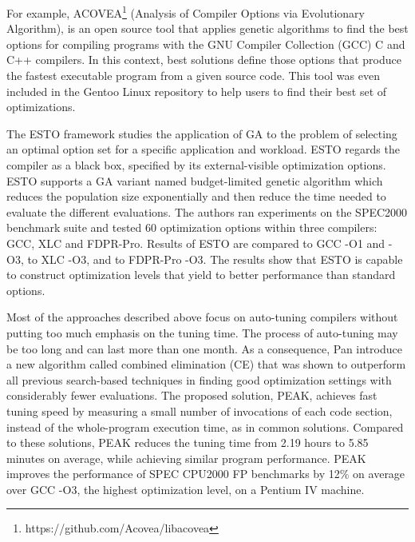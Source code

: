 For example, ACOVEA\footnote{https://github.com/Acovea/libacovea} (Analysis of Compiler Options via Evolutionary Algorithm), is an open source tool that applies genetic algorithms to find the best options for compiling programs with the GNU Compiler Collection (GCC) C and C++ compilers. In this context, best solutions define those options that produce the fastest executable program from a given source code. This tool was even included in the Gentoo Linux
repository to help users to find their best set of optimizations.

The ESTO framework\cite{bashkansky2007black} studies the application of GA to the problem of selecting an optimal option set for a specific application and workload. ESTO regards the compiler as a black box, specified by its external-visible optimization options. ESTO supports a GA variant named budget-limited genetic algorithm which reduces the population size exponentially and then reduce the time needed to evaluate the different evaluations. The authors ran experiments on the SPEC2000 benchmark suite and tested 60 optimization options within three compilers: GCC, XLC and FDPR-Pro. Results of ESTO are compared to GCC -O1 and -O3, to XLC -O3, and to FDPR-Pro -O3. The results show that ESTO is capable to construct optimization levels that yield to better performance than standard options.


Most of the approaches described above focus on auto-tuning compilers without putting too much emphasis on the tuning time. The process of auto-tuning may be too long and can last more than one month\cite{hoste2008cole}. As a consequence, Pan \etal\cite{pan2006fast} introduce a new algorithm called combined elimination (CE) that was shown to outperform all previous search-based techniques in finding good optimization settings with considerably fewer evaluations. The proposed solution, PEAK, achieves fast tuning speed by measuring a small number of invocations of each code section, instead of the whole-program execution time, as in common solutions. Compared to these solutions, PEAK reduces the tuning time from 2.19 hours to 5.85 minutes on average, while achieving similar program performance.
PEAK improves the performance of SPEC CPU2000 FP benchmarks by 12\% on average over GCC -O3, the highest optimization level, on a Pentium IV machine.



